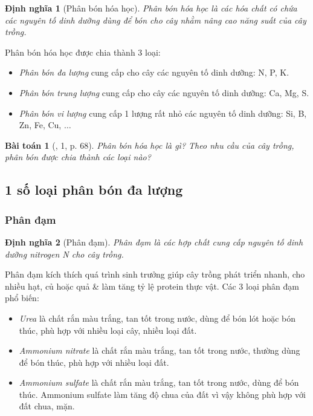 \documentclass{article}
\newtheorem{baitoan}{Bài toán}
\newtheorem{dinhnghia}{Định nghĩa}
\begin{document}
\begin{dinhnghia}[Phân bón hóa học]
	\emph{Phân bón hóa học} là các hóa chất có chứa các nguyên tố dinh dưỡng dùng để bón cho cây nhằm nâng cao năng suất của cây trồng.
\end{dinhnghia}
Phân bón hóa học được chia thành 3 loại:
\begin{itemize}
	\item \textit{Phân bón đa lượng} cung cấp cho cây các nguyên tố dinh dưỡng: N, P, K.
	\item \textit{Phân bón trung lượng} cung cấp cho cây các nguyên tố dinh dưỡng: Ca, Mg, S.
	\item \textit{Phân bón vi lượng} cung cấp 1 lượng rất nhỏ các nguyên tố dinh dưỡng: Si, B, Zn, Fe, Cu, $\ldots$
\end{itemize}

\begin{baitoan}[\cite{SGK_KHTN_8_Canh_Dieu}, 1, p. 68]
	Phân bón hóa học là gì? Theo nhu cầu của cây trồng, phân bón được chia thành các loại nào?
\end{baitoan}

\subsection{1 số loại phân bón đa lượng}

\subsubsection{Phân đạm}

\begin{dinhnghia}[Phân đạm]
	\emph{Phân đạm} là các hợp chất cung cấp nguyên tố dinh dưỡng nitrogen \emph{N} cho cây trồng.
\end{dinhnghia}
Phân đạm kích thích quá trình sinh trưởng giúp cây trồng phát triển nhanh, cho nhiều hạt, củ hoặc quả \& làm tăng tỷ lệ protein thực vật. Các 3 loại phân đạm phổ biến:
\begin{itemize}
	\item \textit{Urea}  là chất rắn màu trắng, tan tốt trong nước, dùng để bón lót hoặc bón thúc, phù hợp với nhiều loại cây, nhiều loại đất.
	\item \textit{Ammonium nitrate}  là chất rắn màu trắng, tan tốt trong nước, thường dùng để bón thúc, phù hợp với nhiều loại đất.
	\item \textit{Ammonium sulfate}  là chất rắn màu trắng, tan tốt trong nước, dùng để bón thúc. Ammonium sulfate làm tăng độ chua của đất vì vậy không phù hợp với đất chua, mặn.
\end{itemize}
\end{document}
